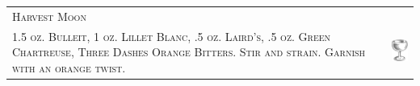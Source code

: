 \documentclass{article}
\begin{document}
\begin{tabular}{b{2.5in} m{0.625in}}
  \multicolumn{2}{p{3.5in}}{\centering\Huge\textsc{Harvest Moon}} \\ 
  
  \textsc{1.5 oz. Bulleit, 1 oz. Lillet Blanc, .5 oz. Laird's, .5 oz.
    Green Chartreuse, Three Dashes Orange Bitters. Stir and
    strain. Garnish with an orange twist.}  &
  \includegraphics[width=0.5in]{coupe.png}
\end{tabular}
\end{document}
